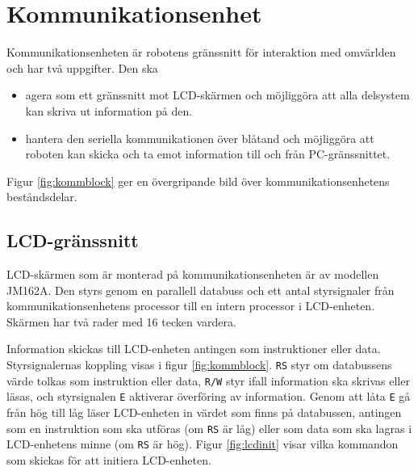 \section{Kommunikationsenhet}
Kommunikationsenheten är robotens gränssnitt för interaktion med omvärlden och har två uppgifter. Den ska
\begin{itemize}
\item agera som ett gränssnitt mot LCD-skärmen och möjliggöra att alla delsystem kan skriva ut information på den.
\item hantera den seriella kommunikationen över blåtand och möjliggöra att roboten kan skicka och ta emot information till och från PC-gränssnittet.
\end{itemize}

Figur \ref{fig:kommblock} ger en övergripande bild över kommunikationsenhetens beståndsdelar.


\subsection{LCD-gränssnitt}
LCD-skärmen som är monterad på kommunikationsenheten är av modellen JM162A. Den styrs genom en parallell databuss och ett antal styrsignaler från kommunikationsenhetens processor till en intern processor i LCD-enheten. Skärmen har två rader med 16 tecken vardera. \cite{lcd}


Information skickas till LCD-enheten antingen som instruktioner eller data. Styrsignalernas koppling visas i figur \ref{fig:kommblock}. \verb|RS| styr om databussens värde tolkas som instruktion eller data, \verb|R/W| styr ifall information ska skrivas eller läsas, och styrsignalen \verb|E| aktiverar överföring av information. Genom att låta \verb|E| gå från hög till låg läser LCD-enheten in värdet som finns på databussen, antingen som en instruktion som ska utföras (om \verb|RS| är låg) eller som data som ska lagras i LCD-enhetens minne (om \verb|RS| är hög). Figur \ref{fig:lcdinit} visar vilka kommandon som skickas för att initiera LCD-enheten.




